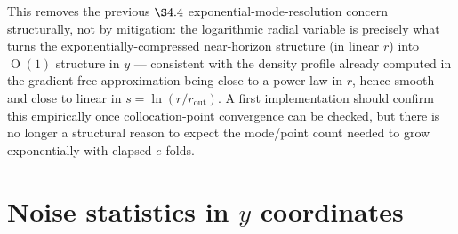 \documentclass[a4paper,11pt]{article}
\DeclareMathOperator{\Or}{O}
\newcommand{\rad}{r}                         %
\newcommand{\yco}{y}                         %
\newcommand{\rout}{\rad_{\mathrm{out}}}      %
\begin{document}
This removes the previous $\S4.4$ exponential-mode-resolution concern
structurally, not by mitigation: the logarithmic radial variable is
precisely what turns the exponentially-compressed near-horizon structure
(in linear $\rad$) into $\Or(1)$ structure in $\yco$ --- consistent with
the density profile already computed in the gradient-free approximation
being close to a power law in $\rad$, hence smooth and close to linear in
$s=\ln(\rad/\rout)$. A first implementation should confirm this
empirically once collocation-point convergence can be checked, but there
is no longer a structural reason to expect the mode/point count needed to
grow exponentially with elapsed $e$-folds.

\section{Noise statistics in $\yco$ coordinates}
\label{sec:noise-y}
\end{document}
